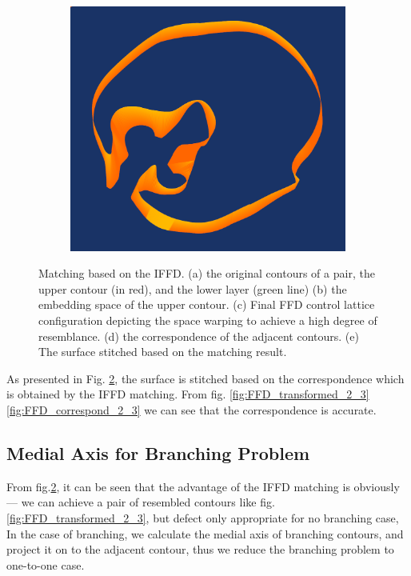 \documentclass[3p,times]{elsarticle}
\begin{document}
\begin{figure}[ht]
\begin{subfigure}[b]{0.25\textwidth}
\end{subfigure}
~~~~~~~~~~~~~~~~~~~~~
\begin{subfigure}[b]{0.25\textwidth}
\includegraphics[width=\textwidth,height=0.15\textheight]{../picture/FFD_surface_2_3.png}
\caption{}
\label{fig:FFD_surface_2_3}
\end{subfigure}
\caption{Matching based on the IFFD. 
  (a) the original contours of a pair, the upper contour (in red), and the lower layer (green line)
  (b) the embedding space of the upper contour.
  (c) Final FFD control lattice configuration depicting the space
  warping to achieve a high degree of resemblance.
  (d) the correspondence of the adjacent contours.
  (e) The surface stitched based on the matching result.}
\label{fig:FFD_Result}
\end{figure}


As presented in Fig. \ref{fig:FFD_Result}, the surface is stitched
based on the correspondence which is obtained by the IFFD
matching. From fig. \ref{fig:FFD_transformed_2_3} \ref{fig:FFD_correspond_2_3} we
can see that the correspondence is accurate.

\subsection{Medial Axis for Branching Problem}
\label{medial axis}
From fig.\ref{fig:FFD_Result}, it can be seen that the advantage of
the IFFD matching is obviously --- we can achieve a pair of resembled contours like
fig.\ref{fig:FFD_transformed_2_3}, but defect only appropriate for no branching case, In the
case of branching, we calculate the medial axis of branching
contours, and project it on to the adjacent contour, thus we reduce
the branching problem to one-to-one case.
\end{document}
